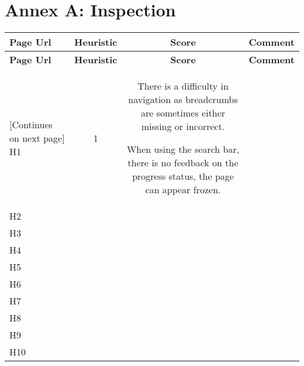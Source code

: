 
\section{Annex A: Inspection}

\begin{tabularx}{\linewidth}{l c c X}
    \toprule
    \textbf{Page Url} & \textbf{Heuristic} & \textbf{Score} & \textbf{Comment} \\
    \midrule
    \endfirsthead
    \toprule
    \textbf{Page Url} & \textbf{Heuristic} & \textbf{Score} & \textbf{Comment} \\
    \midrule
    \endhead
    \midrule
    \footnotesize [Continues on next page]
    \endfoot
    \bottomrule
    \endlastfoot
        H1 & 1 & There is a difficulty in navigation as breadcrumbs are sometimes either missing or incorrect.\par When using the search bar, there is no feedback on the progress status, the page can appear frozen. \\ \midrule
        H2 &  & \\ \midrule
        H3 &  & \\ \midrule
        H4 &  & \\ \midrule
        H5 &  & \\ \midrule
        H6 &  & \\ \midrule
        H7 &  & \\ \midrule
        H8 &  & \\ \midrule
        H9 &  & \\ \midrule
        H10 &  &
    \end{tabularx}
    

